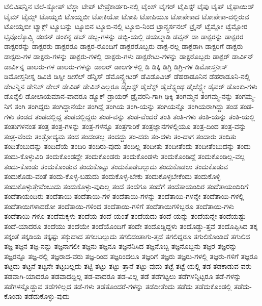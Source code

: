 {ಟೆಲಿವಿಷನ್ನಿನ
ಟೆಲೆ-ಸ್ಕೋಪ್
ಟೆಸ್ಲಾ
ಟೇಪ್
ಟೇಪ್ರೆಕಾರ್ಡರಿ-ನಲ್ಲಿ
ಟೈಂಸ್
ಟೈಗರ್
ಟೈಪಿಸ್ಟ್
ಟೈಪು
ಟೈಪ್
ಟೈಫಾಯಿಡ್
ಟೈಮ್
ಟೈಮ್ಸ್
ಟೊಯ್ನಬಿ
ಟೊಯ್ನಬೀ
ಟೋಕಿಯೋ
ಟೋಪಿ
ಟೋಪಿಯೂ
ಟೋಪೇಕಾದ
ಟೋಪೇಕಾ-ದಲ್ಲಿರುವ
ಟೋಯ್ನಬೀ
ಟ್ಯಾಕ್ಸ್
ಟ್ಯೂಬನ್ನು
ಟ್ಯೂಬಿನ
ಟ್ಯೂಬಿ-ನಲ್ಲಿ
ಟ್ಯೂಬಿ-ನಿಂದ
ಟ್ರಾನ್ಸ್ಪರ್ಸನಲ್
ಟ್ರೈನ್
ಟ್ವೆಮ್ಲೋ
ಟ್ವೆಮ್ಲೋರ
ಟ್ಸಿವೊಲ್ಕೊವ್ಸ್ಕಿ
ಡಂಕನ್
ಡಂಕನ್ನ
ಡಬ್
ಡಬ್ಬ-ಗಳನ್ನು
ಡಬ್ಬಿ-ಯಲ್ಲಿ
ಡಯಲ್ಮಾಡಿ
ಡವ್ಸನ್
ಡಾ
ಡಾಕ್ಟರನ್ನು
ಡಾಕ್ಟರರ
ಡಾಕ್ಟರರನ್ನು
ಡಾಕ್ಟರರು
ಡಾಕ್ಟರರೂ
ಡಾಕ್ಟರ-ರೊಂದಿಗೆ
ಡಾಕ್ಟರರೊಬ್ಬರು
ಡಾಕ್ಟ-ರಲ್ಲ
ಡಾಕ್ಟರಾಗಿ
ಡಾಕ್ಟರಿಗೆ
ಡಾಕ್ಟರು
ಡಾಕ್ಟರು-ಗಳ
ಡಾಕ್ಟರು-ಗಳನ್ನು
ಡಾಕ್ಟರು-ಗಳಲ್ಲಿ
ಡಾಕ್ಟರು-ಗಳು
ಡಾಕ್ಟರೇಟು-ಗಳನ್ನು
ಡಾಕ್ಟರೊಬ್ಬರು
ಡಾಕ್ಟರ್
ಡಾರ್ವಿನ್
ಡಾರ್ವಿನ್ನ
ಡಾಲರು-ಗಳ
ಡಾಲರು-ಗಳನ್ನು
ಡಾಲರ್
ಡಾಲರ್ಗಳಲ್ಲಿ
ಡಿ
ಡಿಕ್ಕಿ
ಡಿಗ್ರಿ
ಡಿಗ್ರಿ-ಗಳ
ಡಿಮೋಸ್ತನೀಸ್
ಡಿಮೋಸ್ತನೀಸ್ನ
ಡಿವಿಜಿ
ಡಿಸ್ನೀ
ಡೀಸೆಲ್
ಡೆನ್ನಿಸ್
ಡೆಮೊನ್ಸ್ಟ್ರೇಟರ್
ಡೆವಿಡೊವಿಚ್
ಡೆಹರಾಡೂನಿನ
ಡೆಹರಾಡೂನಿ-ನಲ್ಲಿ
ಡೇಟನ್ನಿನ
ಡೇನಿಸ್
ಡೇಲ್
ಡೇವಿಡ್
ಡೇವಿಸ್ಎಲ್ಲರೂ
ಡೈಜಸ್ಟ್
ಡೈಜೆಸ್ಟ್
ಡೈಜೆಸ್ಟ್ನಂಥ
ಡೈಜೆಸ್ಟ್ಮೇ
ಡೈವರ್
ಡೊಂಕು-ಗಳು
ಡೊನ್ನೆಲಿ
ಡೋಲಾಯಮಾನ-ವಾದರೂ
ಡ್ಯೂಕ್
ಡ್ರಾಯರ್
ಡ್ರೈವರನಿ-ಗಾಗಿ
ಢಿಕ್ಕಿ
ತಂಗಮ್ಮನ
ತಂಗಮ್ಮ-ನನ್ನು
ತಂಗಮ್ಮ-ನಿಗೆ
ತಂಗಿ
ತಂಗಿದ್ದರು
ತಂಗಿದ್ದಾನೆಯೇ
ತಂಗಿದ್ದೆ
ತಂಗಿಯ
ತಂಗಿ-ಯನ್ನು
ತಂಗಿಯನ್ನೊ
ತಂಗಿಯರಾಗಿದ್ದು
ತಂಡ
ತಂಡ-ಗಳು
ತಂಡದ
ತಂಡದಲ್ಲಿದ್ದ
ತಂಡದಲ್ಲಿದ್ದರು
ತಂಡ-ವನ್ನು
ತಂಡ-ವೆಂದರೆ
ತಂತಿ
ತಂತಿ-ಗಳು
ತಂತಿ-ಯನ್ನು
ತಂತಿ-ಯಲ್ಲಿ
ತಂತುಗಳನಂತ
ತಂತ್ರ
ತಂತ್ರ-ಗಳನ್ನು
ತಂತ್ರ-ಗಳನ್ನೂ
ತಂತ್ರಗಾರಿಕೆ
ತಂತ್ರಜ್ಞಾನಗಳಲ್ಲಿಯೂ
ತಂತ್ರ-ದಿಂದ
ತಂತ್ರ-ವನ್ನು
ತಂತ್ರ-ವೆಂದು
ತಂತ್ರೋದ್ಯಮ
ತಂದ
ತಂದಂತಲ್ಲ
ತಂದದ್ದು
ತಂ-ದರು
ತಂ-ದಳು
ತಂ-ದಾಗ
ತಂದಾರು
ತಂದಿತು
ತಂದಿತೆಂಬುದನ್ನು
ತಂದಿದೆಯೆ
ತಂದಿರಿ
ತಂದಿರು-ವುದು
ತಂದಿಲ್ಲ
ತಂದೀತು
ತಂದೀತೆಂದು
ತಂದೀತೆಂಬುದನ್ನು
ತಂದು
ತಂದು-ಕೊಳ್ಳುವಿರಿ
ತಂದುಕೊಂಡದ್ದೇ
ತಂದುಕೊಂಡರು
ತಂದುಕೊಂಡಳು
ತಂದುಕೊಂಡಿದ್ದೆ
ತಂದುಕೊಂಡಿಲ್ಲ-ವಲ್ಲ
ತಂದು-ಕೊಂಡು
ತಂದುಕೊಂಡುವ
ತಂದುಕೊಟ್ಟು
ತಂದುಕೊಡಬಲ್ಲುದು
ತಂದುಕೊಡಲು
ತಂದುಕೊಡುವ
ತಂದುಕೊಡು-ವಂತೆ
ತಂದು-ಕೊಳ್ಳ-ಬಹುದು
ತಂದುಕೊಳ್ಳ-ಬೇಕು
ತಂದುಕೊಳ್ಳಬೇಕೆಂದು
ತಂದುಕೊಳ್ಳಿ
ತಂದುಕೊಳ್ಳುತ್ತೇವೆಂಬುದು
ತಂದುಕೊಳ್ಳು-ವುದಿಲ್ಲ
ತಂದೆ
ತಂದೆಗೂ
ತಂದೆಗೆ
ತಂದೆತಾಯಂದಿರ
ತಂದೆತಾಯಂದಿರಿಗೆ
ತಂದೆತಾಯಂದಿರು
ತಂದೆತಾಯಿ
ತಂದೆತಾಯಿ-ಗಳ
ತಂದೆತಾಯಿ-ಗಳನ್ನು
ತಂದೆತಾಯಿ-ಗಳನ್ನೇ
ತಂದೆತಾಯಿ-ಗಳಲ್ಲಿ
ತಂದೆತಾಯಿಗಳಾದರೋ
ತಂದೆತಾಯಿ-ಗಳಿಂದ
ತಂದೆತಾಯಿ-ಗಳಿಗೆ
ತಂದೆತಾಯಿಗಳಿಬ್ಬರೂ
ತಂದೆತಾಯಿ-ಗಳು
ತಂದೆತಾಯಿ-ಗಳೂ
ತಂದೆಮಕ್ಕಳು
ತಂದೆಯ
ತಂದೆ-ಯಂತೆ
ತಂದೆಯದು
ತಂದೆ-ಯನ್ನು
ತಂದೆಯನ್ನೇ
ತಂದೆಯಷ್ಟು
ತಂದೆ-ಯಾದರೂ
ತಂದೆಯು
ತಂದೆಯೇ
ತಂದೆಯೊಂದಿಗೆ
ತಂದೇ
ತಂದೊಡ್ಡಿದ್ದಳು
ತಂದೊಡ್ಡು-ತ್ತವೆ
ತಂದೊಪ್ಪಿಸಿದ
ತಕ್ಕ
ತಕ್ಕಂತೆ
ತಕ್ಕಡಿಯ
ತಕ್ಕಷ್ಟು
ತಕ್ಕುದಾದ
ತಗಲಬಲ್ಲುದು
ತಗಲಿದಂತಾಗು-ತ್ತದೆ
ತಗಲಿದ್ದರೂ
ತಗುಲಿಕೊಂಡಿದೆ
ತಗುಲಿದ
ತಜ್ಞ
ತಜ್ಞನ
ತಜ್ಞ-ನನ್ನು
ತಜ್ಞನಾಗಲೀ
ತಜ್ಞನು
ತಜ್ಞನೂ
ತಜ್ಞನೆನಿಸಿದ
ತಜ್ಞನೊಬ್ಬ
ತಜ್ಞನೊಬ್ಬನು
ತಜ್ಞರ
ತಜ್ಞರನ್ನು
ತಜ್ಞರನ್ನೂ
ತಜ್ಞ-ರಲ್ಲಿ
ತಜ್ಞರಾದ-ವರು
ತಜ್ಞ-ರಿಂದ
ತಜ್ಞರಿಂದಲೂ
ತಜ್ಞರಿಗೆ
ತಜ್ಞರು
ತಜ್ಞರು-ಗಳಲ್ಲಿ
ತಜ್ಞರು-ಗಳಿಗೆ
ತಜ್ಞರೂ
ತಟ್ಟದು
ತಟ್ಟನೆ
ತಟ್ಟನೇ
ತಟ್ಟಬಲ್ಲದು
ತಟ್ಟಿ
ತಟ್ಟು
ತಟ್ಟು-ತ್ತಾನೆ
ತಟ್ಟು-ವುದು
ತಟ್ಟೆ
ತಟ್ಟೆ-ಯಲ್ಲಿ
ತಡ
ತಡಕಾಡುವ-ವರು
ತಡವಾಗಿ-ಯಾದರೂ
ತಡವಾದದ್ದಿಲ್ಲ
ತಡ-ವಾದರೂ
ತಡ-ವಿಲ್ಲ
ತಡೆ
ತಡೆಗಟ್ಟಲು
ತಡೆಗಳನ್ನಿಟ್ಟರೂ
ತಡೆ-ಗಳನ್ನು
ತಡೆಗಳನ್ನೊಡ್ಡುವ
ತಡೆಗಳಿಲ್ಲದ
ತಡೆ-ಗಳು
ತಡೆತೊಂದರೆ-ಗಳನ್ನು
ತಡೆದೀತೆಂದು
ತಡೆದು
ತಡೆದುಕೊಂಡಲ್ಲಿ
ತಡೆದು-ಕೊಂಡು
ತಡೆದುಕೊಳ್ಳು-ವುದು
}
